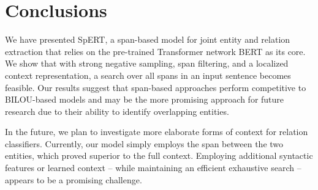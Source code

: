 \documentclass{ecai}
\begin{document}
\section{Conclusions}
We have presented SpERT, a span-based model for joint entity and relation extraction that relies on the pre-trained Transformer network BERT as its core. We show that with strong negative sampling, span filtering, and a localized context representation, a search over all spans in an input sentence becomes feasible. Our results suggest that span-based approaches perform competitive to BILOU-based models and may be the more promising approach for future research due to their ability to identify overlapping entities.

In the future, we plan to investigate more elaborate forms of context for relation classifiers. Currently, our model simply employs the span between the two entities, which proved superior to the full context. Employing additional syntactic features or learned context -- while maintaining an efficient exhaustive search -- appears to be a promising challenge.










\end{document}
